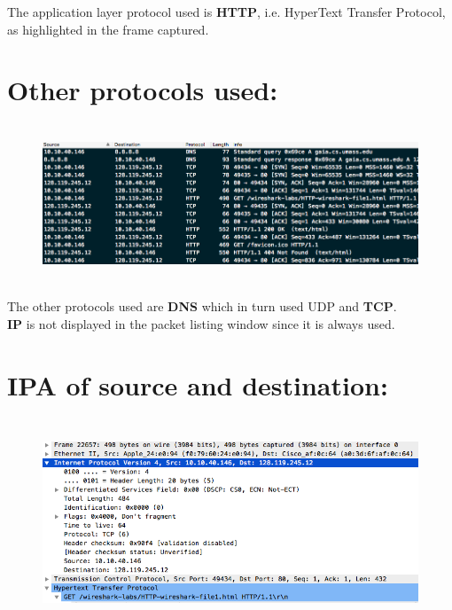 \documentclass[]{report}
\begin{document}
The application layer protocol used is \textbf{HTTP}, i.e. HyperText Transfer Protocol, as highlighted in the frame captured.
\section{Other protocols used:}

\begin{figure}[H]
	\vspace{0pt}
	\includegraphics[height = 133pt, keepaspectratio]{Snapshots/q3.png}
\end{figure}

The other protocols used are \textbf{DNS} which in turn used UDP and \textbf{TCP}. 
\\
 \textbf{IP} is not displayed in the packet listing window since it is always used. 
\section{IPA of source and destination:}

\begin{figure}[H]
	\vspace{0pt}
	\includegraphics[height = 175pt, keepaspectratio]{Snapshots/q4_1.png}
\end{figure}
\end{document}
